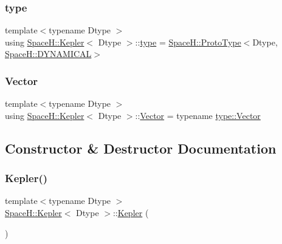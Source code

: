 \mbox{\label{struct_space_h_1_1_kepler_a34c000d5045014f85cad95306c3d8a9e}} 
\subsubsection{\texorpdfstring{type}{type}}
{\footnotesize\ttfamily template$<$typename Dtype $>$ \\
using \mbox{\hyperlink{struct_space_h_1_1_kepler}{Space\+H\+::\+Kepler}}$<$ Dtype $>$\+::\mbox{\hyperlink{struct_space_h_1_1_kepler_a34c000d5045014f85cad95306c3d8a9e}{type}} =  \mbox{\hyperlink{struct_space_h_1_1_proto_type}{Space\+H\+::\+Proto\+Type}}$<$Dtype, \mbox{\hyperlink{namespace_space_h_a3e55b9bc2a9e10c08ce8121bce11244a}{Space\+H\+::\+D\+Y\+N\+A\+M\+I\+C\+AL}}$>$}

\mbox{\label{struct_space_h_1_1_kepler_aa0f5e7ecefa626a0e32a9435dd9662cd}} 
\subsubsection{\texorpdfstring{Vector}{Vector}}
{\footnotesize\ttfamily template$<$typename Dtype $>$ \\
using \mbox{\hyperlink{struct_space_h_1_1_kepler}{Space\+H\+::\+Kepler}}$<$ Dtype $>$\+::\mbox{\hyperlink{struct_space_h_1_1_kepler_aa0f5e7ecefa626a0e32a9435dd9662cd}{Vector}} =  typename \mbox{\hyperlink{struct_space_h_1_1_proto_type_a316b81f4660b2b4fab14a8e1f23b6089}{type\+::\+Vector}}}



\subsection{Constructor \& Destructor Documentation}
\mbox{\label{struct_space_h_1_1_kepler_a3763d2c0a28c244c5a9b992f95ebdd9d}} 
\subsubsection{\texorpdfstring{Kepler()}{Kepler()}\hspace{0.1cm}{\footnotesize\ttfamily [1/3]}}
{\footnotesize\ttfamily template$<$typename Dtype $>$ \\
\mbox{\hyperlink{struct_space_h_1_1_kepler}{Space\+H\+::\+Kepler}}$<$ Dtype $>$\+::\mbox{\hyperlink{struct_space_h_1_1_kepler}{Kepler}} (\begin{DoxyParamCaption}{ }\end{DoxyParamCaption})\hspace{0.3cm}{\ttfamily [delete]}}

